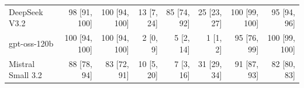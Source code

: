 \begin{tabular}{lrrrrrrr}
DeepSeek V3.2 & 98 {\scriptsize [91, 100]} & 100 {\scriptsize [94, 100]} & 13 {\scriptsize [7, 24]} & 85 {\scriptsize [74, 92]} & 25 {\scriptsize [23, 27]} & 100 {\scriptsize [99, 100]} & 95 {\scriptsize [94, 96]} \\
gpt-oss-120b & 100 {\scriptsize [94, 100]} & 100 {\scriptsize [94, 100]} & 2 {\scriptsize [0, 9]} & 5 {\scriptsize [2, 14]} & 1 {\scriptsize [1, 2]} & 95 {\scriptsize [76, 99]} & 100 {\scriptsize [99, 100]} \\
Mistral Small 3.2 & 88 {\scriptsize [78, 94]} & 83 {\scriptsize [72, 91]} & 10 {\scriptsize [5, 20]} & 7 {\scriptsize [3, 16]} & 31 {\scriptsize [29, 34]} & 91 {\scriptsize [87, 93]} & 82 {\scriptsize [80, 83]} \\
\bottomrule
\end{tabular}

